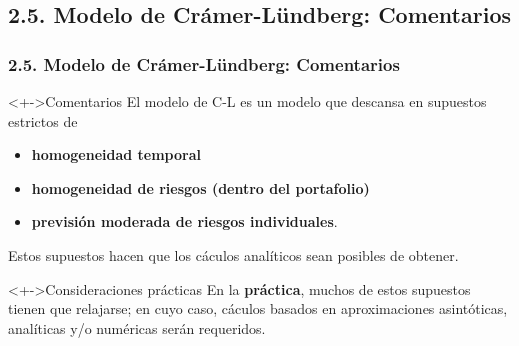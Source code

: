 \documentclass[cjk,t,compress]{beamer}
\begin{document}
%
%
\subsection{2.5. Modelo de Cr\'amer-L\"undberg: Comentarios}

\begin{frame}[fragile]
\frametitle{2.5. Modelo de Cr\'amer-L\"undberg: Comentarios}
\scriptsize  	

\vspace{0.1cm}
\begin{block}<+->{Comentarios}
	\vspace{0.1cm}
	El modelo de C-L es un modelo que descansa en supuestos estrictos de
	\begin{itemize}
	  \item {\bf homogeneidad temporal}
	  \item {\bf homogeneidad de riesgos (dentro del portafolio)}
	  \item {\bf previsi\'on moderada de riesgos individuales}.
	\end{itemize}
	Estos supuestos hacen que los c\'aculos anal\'iticos sean posibles de obtener.
\end{block}

\vspace{0.1cm}
\begin{block}<+->{Consideraciones pr\'acticas}
	\vspace{0.1cm}
	En la {\bf pr\'actica}, muchos de estos supuestos tienen que relajarse; en cuyo caso, c\'aculos basados en aproximaciones asint\'oticas, anal\'iticas y/o num\'ericas ser\'an requeridos.
\end{block}


\end{frame}
\end{document}
